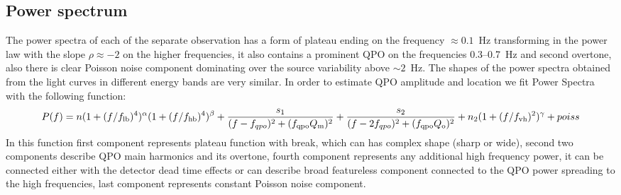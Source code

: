 \subsection{Power spectrum}
    The power spectra of each of the separate observation has a form of plateau ending on the frequency $\approx0.1$~Hz transforming in the power law with the slope $\rho\approx-2$ on the higher frequencies, it also contains a prominent QPO on the frequencies 0.3--0.7~Hz and second overtone, also there is clear Poisson noise component dominating over the source variability above $\sim2$~Hz.
    The shapes of the power spectra obtained from the light curves in different energy bands are very similar.
    In order to estimate QPO amplitude and location we fit Power Spectra with the following function:
\begin{equation}
        P(f) = n (1 + (f/f_{\rm lb})^4)^{\alpha} (1 + (f/f_{\rm hb})^4)^{\beta} + \frac{s_1}{(f - f_{qpo})^2 + (f_{\rm qpo} Q_{\rm m})^2} + \frac{s_2}{(f - 2f_{qpo})^2 + (f_{\rm qpo} Q_{\rm o})^2} + n_2 (1 + (f/f_{\rm vh})^2)^{\gamma} + poiss
        \label{eq:complex_fit}
\end{equation}
In this function first component represents plateau function with break, which can has complex shape (sharp or wide), second two components describe QPO main harmonics and its overtone, fourth component represents any additional high frequency power, it can be connected either with the detector dead time effects or can describe broad featureless component connected to the QPO power spreading to the high frequencies, last component represents constant Poisson noise component.

